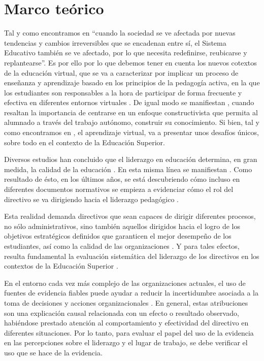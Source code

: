 \documentclass[spanish]{textolivre}
\begin{document}
\section{Marco teórico}
Tal y como encontramos en \textcite[p.288]{miras_teruel_liderazgo_2020} “cuando la sociedad se ve afectada por nuevas tendencias y cambios irreversibles que se encadenan entre sí, el Sistema Educativo también se ve afectado, por lo que necesita redefinirse, reubicarse y replantearse”. Es por ello por lo que debemos tener en cuenta los nuevos cotextos de la educación virtual, que se va a caracterizar por implicar un proceso de enseñanza y aprendizaje basado en los principios de la pedagogía activa, en la que los estudiantes son responsables a la hora de participar de forma frecuente y efectiva en diferentes entornos virtuales \cite{aurangzeb2020analysis}. De igual modo se manifiestan \textcite{ibarra26medios}, cuando resaltan la importancia de centrarse en un enfoque constructivista que permita al alumnado a través del trabajo autónomo, construir su conocimiento. Si bien, tal y como encontramos en \textcite{cordie2018revolution}, el aprendizaje virtual, va a presentar unos desafíos únicos, sobre todo en el contexto de la Educación Superior.

Diversos estudios han concluido que el liderazgo en educación determina, en gran medida, la calidad de la educación \cite{marichal2018}. En esta misma línea se manifiestan \textcite{leiva-guerrero_liderazgo_2019}. Como resultado de ésto, en los últimos años, se está descubriendo cómo incluso en diferentes documentos normativos se empieza a evidenciar cómo el rol del directivo se va dirigiendo hacia el liderazgo pedagógico \cite{campos_lipedagogico_2019}.

Esta realidad demanda directivos que sean capaces de dirigir diferentes procesos, no sólo administrativos, sino también aquellos dirigidos hacia el logro de los objetivos estratégicos definidos que garanticen el mejor desempeño de los estudiantes, así como la calidad de las organizaciones \cite{leiva-guerrero_liderazgo_2019}. Y para tales efectos, resulta fundamental la evaluación sistemática del liderazgo de los directivos en los contextos de la Educación Superior \cite{moreno2020evaluacion}.

En el entorno cada vez más complejo de las organizaciones actuales, el uso de fuentes de evidencia fiables puede ayudar a reducir la incertidumbre asociada a la toma de decisiones y acciones organizacionales \cite{jepsen_perceived_2022}. En general, estas atribuciones son una explicación causal relacionada con un efecto o resultado observado, habiéndose prestado atención al comportamiento y efectividad del directivo en diferentes situaciones. Por lo tanto, para evaluar el papel del uso de la evidencia en las percepciones sobre el liderazgo y el lugar de trabajo, se debe verificar el uso que se hace de la evidencia. 
\end{document}
